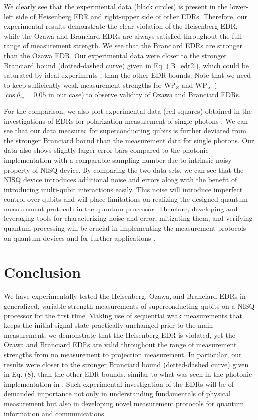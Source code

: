 \documentclass[%
reprint,
superscriptaddress,
 amsmath,amssymb,
 aps,
pra,
]{revtex4-2}
\begin{document}
We clearly see that the experimental data (black circles) is present in the lower-left side of Heisenberg EDR and right-upper side of other EDRs.  
Therefore, our experimental results demonstrate the clear violation of the Heisenberg EDR, while the Ozawa and Branciard EDRs are always satisfied throughout the full range of measurement strength. 
We see that the Branciard EDRs are stronger than the Ozawa EDR. 
Our experimental data were closer to the stronger Branciard bound (dotted-dashed curve) given in Eq. (\ref{B_edr2}), which could be saturated by ideal experiments \cite{PhysRevLett.112.020402}, than the other EDR bounds. 
Note that we need to keep sufficiently weak measurement strengths for WP$_Z$ and WP$_X$ ($\cos\theta_w=0.05$ in our case) to observe validity of Ozawa and Branciard EDRs.

For the comparison, we also plot experimental data (red squares) obtained in the investigations of EDRs for polarization measurement of single photons \cite{PhysRevLett.112.020402}.
We can see that our data measured for superconducting qubits is further deviated from the stronger Branciard bound than the measurement data for single photons.
Our data also shows slightly larger error bars compared to the photonic implementation with a comparable sampling number due to intrinsic noisy property of NISQ device. 
By comparing the two data sets, we can see that the NISQ device introduces additional noise and errors along with the benefit of introducing multi-qubit interactions easily. 
This noise will introduce imperfect control over qubits and will place limitations on realizing the designed quantum measurement protocols in the quantum processor. 
Therefore, developing and leveraging tools for characterizing noise and error, mitigating them, and verifying quantum processing will be crucial in implementing the measurement protocols on quantum devices and for further applications \cite{PhysRevA.100.052315, PhysRevA.103.042603}.

\section{Conclusion\label{sec:conclusion}}
We have experimentally tested the Heisenberg, Ozawa, and Branciard EDRs  in generalized, variable strength measurements of superconducting qubits on a NISQ processor for the first time. 
Making use of sequential weak measurements that keeps the initial signal state practically unchanged prior to the main measurement, we demonstrate that the Heisenberg EDR is violated, yet the Ozawa and Branciard EDRs are valid throughout the range of measurement strengths from no measurement to projection measurement. 
In particular, our results were closer to the stronger Branciard bound (dotted-dashed curve) given in Eq. (8), than the other EDR bounds, similar to what was seen in the photonic implementation in \cite{PhysRevLett.112.020402}.
Such experimental investigation of the EDRs will be of demanded importance not only in understanding fundamentals of physical measurement but also in developing novel measurement protocols for quantum information and communications. 
\end{document}
